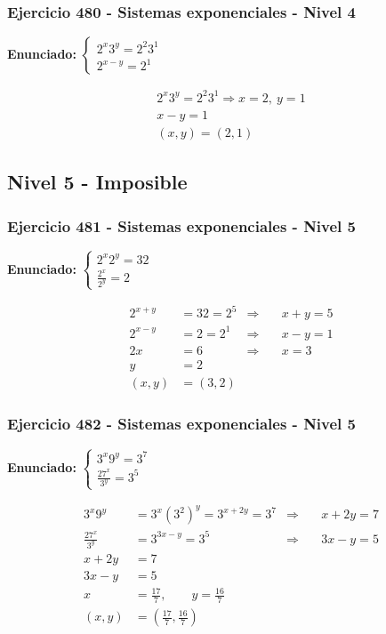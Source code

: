 \documentclass[12pt,a4paper]{article}
\begin{document}
\subsubsection*{Ejercicio 480 - Sistemas exponenciales - Nivel 4}
\textbf{Enunciado:} \(\begin{cases} 2^x3^y=2^{2}3^{1}\\ 2^{x-y}=2^{1}\end{cases}\)

\[
\begin{aligned}
2^x3^y=2^{2}3^{1}\Rightarrow x=2,\ y=1\\
x-y=1\\
\boxed{(x,y)=(2,1)}
\end{aligned}
\]


\newpage

\subsection*{Nivel 5 - Imposible}

\subsubsection*{Ejercicio 481 - Sistemas exponenciales - Nivel 5}
\textbf{Enunciado:} \(\begin{cases}2^x2^y=32\\ \frac{2^x}{2^y}=2\end{cases}\)

\[
\begin{aligned}
2^{x+y}&=32=2^5&\Rightarrow&\quad x+y=5\\
2^{x-y}&=2=2^1&\Rightarrow&\quad x-y=1\\
2x&=6&\Rightarrow&\quad x=3\\
y&=2\\
(x,y)&=\boxed{(3,2)}
\end{aligned}
\]


\subsubsection*{Ejercicio 482 - Sistemas exponenciales - Nivel 5}
\textbf{Enunciado:} \(\begin{cases}3^x9^y=3^7\\ \frac{27^x}{3^y}=3^5\end{cases}\)

\[
\begin{aligned}
3^x9^y&=3^x(3^2)^y=3^{x+2y}=3^7&\Rightarrow&\quad x+2y=7\\
\frac{27^x}{3^y}&=3^{3x-y}=3^5&\Rightarrow&\quad 3x-y=5\\
x+2y&=7\\
3x-y&=5\\
x&=\frac{17}{7},\qquad y=\frac{16}{7}\\
(x,y)&=\boxed{\left(\frac{17}{7},\frac{16}{7}\right)}
\end{aligned}
\]
\end{document}
